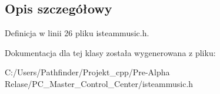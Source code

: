 \subsection{Opis szczegółowy}


Definicja w linii 26 pliku isteammusic.\+h.



Dokumentacja dla tej klasy została wygenerowana z pliku\+:\begin{DoxyCompactItemize}
\item 
C\+:/\+Users/\+Pathfinder/\+Projekt\+\_\+cpp/\+Pre-\/\+Alpha Relase/\+P\+C\+\_\+\+Master\+\_\+\+Control\+\_\+\+Center/isteammusic.\+h\end{DoxyCompactItemize}
